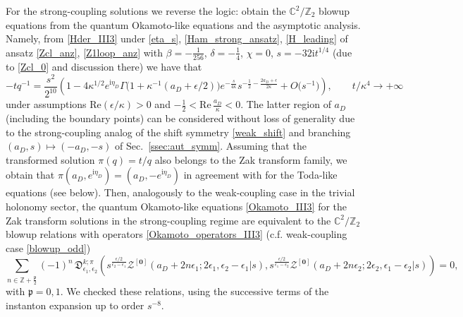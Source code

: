 \documentclass[12pt,a4paper]{article}
\numberwithin{equation}{section}
\newcommand{\ri}{\mathrm{i}}
\newcommand{\D}{\scriptscriptstyle{D}}
\begin{document}
For the strong-coupling solutions we reverse the logic: obtain the $\mathbb{C}^2/\mathbb{Z}_2$ blowup equations from the quantum Okamoto-like equations and the asymptotic analysis. Namely, from  \eqref{Hder_III3} under \eqref{eta_s}, \eqref{Ham_strong_ansatz}, \eqref{H_leading} of ansatz \eqref{Zcl_anz}, \eqref{Z1loop_anz} with $\beta=-\frac1{256}$, $\delta=-\frac14$, $\chi=0$, $s=-32\ri t^{1/4}$ (due to \eqref{Zcl_0} and discussion there) we have that
\begin{equation}\label{QPIII3_strong_as}
-tq^{-1}=\frac{s^2}{2^{10}}\left(1-4\kappa^{1/2}e^{\ri\eta_{\D}}\Gamma\big(1{+}\kappa^{-1}(a_{\D}{+}\epsilon/2)\big)e^{-\frac{s}{4\kappa}}s^{-\frac12-\frac{2a_{\D}+\epsilon}{2\kappa}}+O\big(s^{-1}\big)\right), \qquad t/\kappa^4\rightarrow +\infty    
\end{equation}
under assumptions $\mathrm{Re}(\epsilon/\kappa)>0$ and $-\frac12<\mathrm{Re}\,\frac{a_{\D}}{\kappa}<0$. The latter region of $a_{\D}$ (including the boundary points) can be considered without loss of generality due to the strong-coupling analog of the shift symmetry \eqref{weak_shift} and branching $(a_{\D},s)\mapsto(-a_{\D},-s)$ of Sec.~\ref{ssec:aut_symm}. Assuming that the transformed solution $\pi(q)=t/q$ also belongs to the Zak transform family, we obtain that $\pi(a_{\D},e^{\ri\eta_{\D}})=(a_{\D},-e^{\ri\eta_{\D}})$
in agreement with \cite[Sec. 7.2]{GMS20} for the Toda-like equations (see below). Then, analogously to the weak-coupling case in the trivial holonomy sector, the quantum Okamoto-like equations \eqref{Okamoto_III3} for the Zak transform solutions in the strong-coupling regime are equivalent to the $\mathbb{C}^2/\mathbb{Z}_2$ blowup relations with operators \eqref{Okamoto_operators_III3} (c.f. weak-coupling case \eqref{blowup_odd})
\begin{equation}\label{blowup_odd_strong}
\sum_{n\in\mathbb{Z}+\frac{\mathfrak{p}}2}(-1)^n\,\mathfrak{D}^{k;\pi}_{\epsilon_1,\epsilon_2}\left(s^{\frac{\epsilon/2}{\epsilon_2{-}\epsilon_1}}\mathcal{Z}^{[\mathbf{0}]}(a_{\D}+2n\epsilon_1;2\epsilon_1,\epsilon_2{-}\epsilon_1|s),s^{\frac{\epsilon/2}{\epsilon_1{-}\epsilon_2}}\mathcal{Z}^{[\mathbf{0}]}(a_{\D}+2n\epsilon_2;2\epsilon_2,\epsilon_1{-}\epsilon_2|s)\right)=0, 
\end{equation}
with $\mathfrak{p}=0,1$.
We checked these relations, using the successive terms of the instanton expansion \cite[(4.69)]{BST25} up to order $s^{-8}$.
\end{document}
